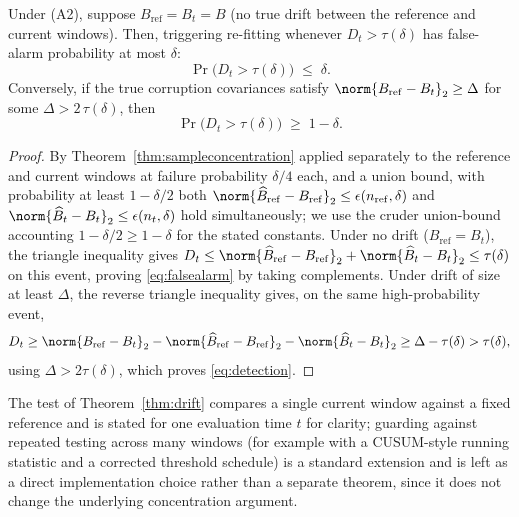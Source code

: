 \begin{theorem}
\label{thm:drift}
Under (A2), suppose $B_{\mathrm{ref}}=B_t=B$ (no true drift between the
reference and current windows). Then, triggering re-fitting whenever
$D_t>\tau(\delta)$ has false-alarm probability at most $\delta$:
\begin{equation}
 \Pr\big(D_t>\tau(\delta)\big)\;\le\;\delta.
 \label{eq:falsealarm}
\end{equation}
Conversely, if the true corruption covariances satisfy
$\norm{B_{\mathrm{ref}}-B_t}_2\ge\Delta$ for some
$\Delta>2\,\tau(\delta)$, then
\begin{equation}
 \Pr\big(D_t>\tau(\delta)\big)\;\ge\;1-\delta.
 \label{eq:detection}
\end{equation}
\end{theorem}
\begin{proof}
By Theorem~\ref{thm:sampleconcentration} applied separately to the
reference and current windows at failure probability $\delta/4$ each, and a
union bound, with probability at least $1-\delta/2$ both
$\norm{\widehat B_{\mathrm{ref}}-B_{\mathrm{ref}}}_2\le
\epsilon(n_{\mathrm{ref}},\delta)$ and
$\norm{\widehat B_t-B_t}_2\le\epsilon(n_t,\delta)$ hold simultaneously; we
use the cruder union-bound accounting $1-\delta/2\ge1-\delta$ for the
stated constants. Under no drift ($B_{\mathrm{ref}}=B_t$), the triangle
inequality gives $D_t\le\norm{\widehat B_{\mathrm{ref}}-B_{\mathrm{ref}}}_2
+\norm{\widehat B_t-B_t}_2\le\tau(\delta)$ on this event, proving
\cref{eq:falsealarm} by taking complements. Under drift of size at least
$\Delta$, the reverse triangle inequality gives, on the same
high-probability event,
\begin{equation*}
 D_t\ge\norm{B_{\mathrm{ref}}-B_t}_2
 -\norm{\widehat B_{\mathrm{ref}}-B_{\mathrm{ref}}}_2
 -\norm{\widehat B_t-B_t}_2
 \ge\Delta-\tau(\delta)>\tau(\delta),
\end{equation*}
using $\Delta>2\tau(\delta)$, which proves \cref{eq:detection}.
\end{proof}

\begin{remark}
The test of Theorem~\ref{thm:drift} compares a single current window
against a fixed reference and is stated for one evaluation time $t$ for
clarity; guarding against repeated testing across many windows (for
example with a CUSUM-style running statistic and a corrected threshold
schedule) is a standard extension and is left as a direct implementation
choice rather than a separate theorem, since it does not change the
underlying concentration argument.
\end{remark}

